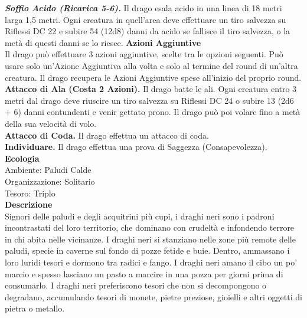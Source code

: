 \begin{multicols}{2}
\emph{\textbf{Soffio Acido (Ricarica 5-6).}} Il drago esala acido in una linea di 18 metri larga 1,5 metri. Ogni creatura in quell'area deve effettuare un tiro salvezza su Riflessi DC  22 e subire 54 (12d8) danni da acido se fallisce il tiro salvezza, o la metà di questi danni se lo riesce. 
\textbf{Azioni Aggiuntive}\\
Il drago può effettuare 3 azioni aggiuntive, scelte tra le opzioni seguenti. Può usare solo un'Azione Aggiuntiva alla volta e solo al termine del round di un'altra creatura. Il drago recupera le Azioni Aggiuntive spese all'inizio del proprio round.\\
\textbf{Attacco di Ala (Costa 2 Azioni).} Il drago batte le ali. Ogni creatura entro 3 metri dal drago deve riuscire un tiro salvezza su Riflessi DC  24 o subire 13 (2d6 + 6) danni contundenti e venir gettato prono. Il drago può poi volare fino a metà della sua velocità di volo.\\
\textbf{Attacco di Coda.} Il drago effettua un attacco di coda.\\
\textbf{Individuare.} Il drago effettua una prova di Saggezza (Consapevolezza).\\
\textbf{Ecologia}\\
Ambiente: Paludi Calde\\
Organizzazione: Solitario\\
Tesoro: Triplo\\
\textbf{Descrizione}\\
Signori delle paludi e degli acquitrini più cupi, i draghi neri sono i padroni incontrastati del loro territorio, che dominano con crudeltà e infondendo terrore in chi abita nelle vicinanze. I draghi neri si stanziano nelle zone più remote delle paludi, specie in caverne sul fondo di pozze fetide e buie. Dentro, ammassano i loro luridi tesori e dormono tra radici e fango. I draghi neri amano il cibo un po’ marcio e spesso lasciano un pasto a marcire in una pozza per giorni prima di consumarlo. I draghi neri preferiscono tesori che non si decompongono o degradano, accumulando tesori di monete, pietre preziose, gioielli e altri oggetti di pietra o metallo.\\


\end{multicols}
